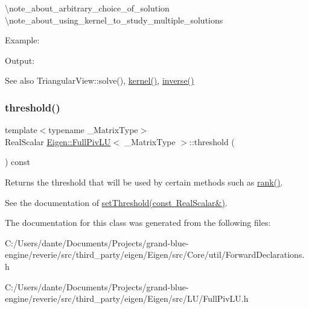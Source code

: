 \textbackslash{}note\+\_\+about\+\_\+arbitrary\+\_\+choice\+\_\+of\+\_\+solution \textbackslash{}note\+\_\+about\+\_\+using\+\_\+kernel\+\_\+to\+\_\+study\+\_\+multiple\+\_\+solutions

Example\+: 
\begin{DoxyCodeInclude}{0}
\end{DoxyCodeInclude}
 Output\+: 
\begin{DoxyVerbInclude}
\end{DoxyVerbInclude}


\begin{DoxySeeAlso}{See also}
Triangular\+View\+::solve(), \mbox{\hyperlink{class_eigen_1_1_full_piv_l_u_a70f52eeb2cd07dfbf790fce106fb4015}{kernel()}}, \mbox{\hyperlink{class_eigen_1_1_full_piv_l_u_ae6f4bb55f859f6353f99cf15ecff4b25}{inverse()}} 
\end{DoxySeeAlso}
\mbox{\label{class_eigen_1_1_full_piv_l_u_ad77539203694f2d85ff7d11616e5a0a5}} 
\subsubsection{\texorpdfstring{threshold()}{threshold()}}
{\footnotesize\ttfamily template$<$typename \+\_\+\+Matrix\+Type$>$ \\
Real\+Scalar \mbox{\hyperlink{class_eigen_1_1_full_piv_l_u}{Eigen\+::\+Full\+Piv\+LU}}$<$ \+\_\+\+Matrix\+Type $>$\+::threshold (\begin{DoxyParamCaption}{ }\end{DoxyParamCaption}) const\hspace{0.3cm}{\ttfamily [inline]}}

Returns the threshold that will be used by certain methods such as \mbox{\hyperlink{class_eigen_1_1_full_piv_l_u_a67a870aa69e699e058d04802ba0bdad9}{rank()}}.

See the documentation of \mbox{\hyperlink{class_eigen_1_1_full_piv_l_u_a414592d82de98f5bd075965caf56d681}{set\+Threshold(const Real\+Scalar\&)}}. 

The documentation for this class was generated from the following files\+:\begin{DoxyCompactItemize}
\item 
C\+:/\+Users/dante/\+Documents/\+Projects/grand-\/blue-\/engine/reverie/src/third\+\_\+party/eigen/\+Eigen/src/\+Core/util/Forward\+Declarations.\+h\item 
C\+:/\+Users/dante/\+Documents/\+Projects/grand-\/blue-\/engine/reverie/src/third\+\_\+party/eigen/\+Eigen/src/\+L\+U/Full\+Piv\+L\+U.\+h\end{DoxyCompactItemize}
